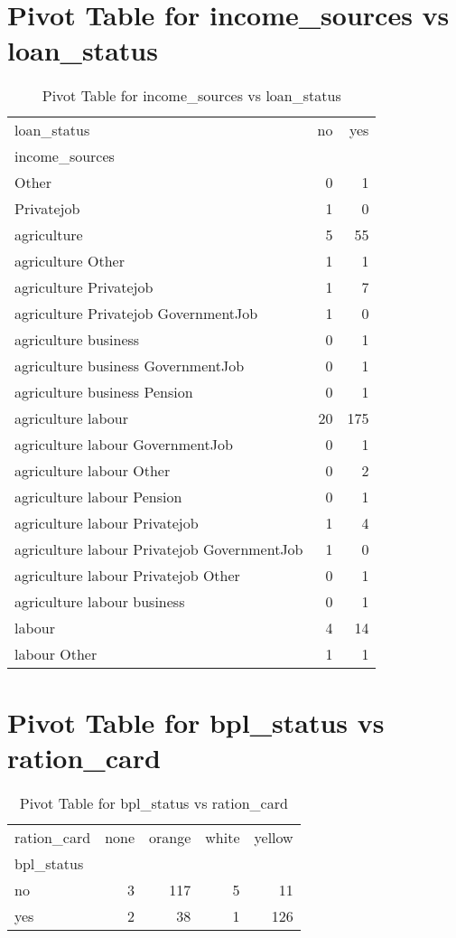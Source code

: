 \documentclass{article}
\begin{document}
\section{Pivot Table for income_sources vs loan_status}
\begin{table}
\caption{Pivot Table for income_sources vs loan_status}
\label{tab:income_sources_loan_status}
\begin{tabular}{lrr}
\toprule
loan_status & no & yes \\
income_sources &  &  \\
\midrule
Other & 0 & 1 \\
Privatejob & 1 & 0 \\
agriculture & 5 & 55 \\
agriculture Other & 1 & 1 \\
agriculture Privatejob & 1 & 7 \\
agriculture Privatejob GovernmentJob & 1 & 0 \\
agriculture business & 0 & 1 \\
agriculture business GovernmentJob & 0 & 1 \\
agriculture business Pension & 0 & 1 \\
agriculture labour & 20 & 175 \\
agriculture labour GovernmentJob & 0 & 1 \\
agriculture labour Other & 0 & 2 \\
agriculture labour Pension & 0 & 1 \\
agriculture labour Privatejob & 1 & 4 \\
agriculture labour Privatejob GovernmentJob & 1 & 0 \\
agriculture labour Privatejob Other & 0 & 1 \\
agriculture labour business & 0 & 1 \\
labour & 4 & 14 \\
labour Other & 1 & 1 \\
\bottomrule
\end{tabular}
\end{table}

\section{Pivot Table for bpl_status vs ration_card}
\begin{table}
\caption{Pivot Table for bpl_status vs ration_card}
\label{tab:bpl_status_ration_card}
\begin{tabular}{lrrrr}
\toprule
ration_card & none & orange & white & yellow \\
bpl_status &  &  &  &  \\
\midrule
no & 3 & 117 & 5 & 11 \\
yes & 2 & 38 & 1 & 126 \\
\bottomrule
\end{tabular}
\end{table}
\end{document}
